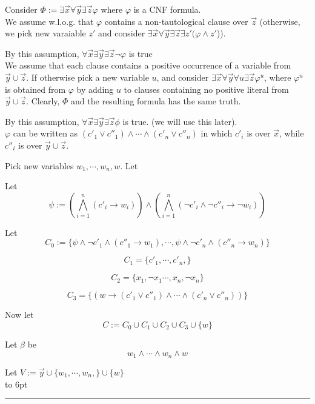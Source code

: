 \documentclass[12pt]{article}
\newenvironment{proof}{\parindent=0pt{\bf Proof: }}{
   \hspace*{\fill}\hbox to 6pt{\leaders\hrule width 6pt height 6pt\hfill}\par}
\begin{document}
\begin{proof}
Consider $\Phi:=\exists \vec{x}\forall\vec{y}\exists \vec{z} \varphi$ where $\varphi$ is a CNF formula. \\

We assume w.l.o.g. that $\varphi$ contains a non-tautological clause over $\vec{z}$ (otherwise, we pick new varaiable $z'$ and consider $\exists\vec{x}\forall\vec{y}\exists\vec{z}\exists z'(\varphi\wedge z'$)).

By this assumption, $\forall\vec{x}\exists\vec{y}\exists\vec{z}\neg \varphi$ is true\\

We assume that each clause contains a positive occurrence of a variable from $\vec{y}\cup\vec{z}$. If otherwise pick a new variable $u$, and consider $\exists \vec{x}\forall\vec{y}\forall u\exists \vec{z}\varphi^u$, where $\varphi^u$ is obtained from $\varphi$ by adding $u$ to clauses containing no positive literal from $\vec{y}\cup\vec{z}$. Clearly, $\Phi$ and the resulting formula has the same truth.

By this assumption, $\forall\vec{x}\exists\vec{y}\exists\vec{z}\phi$ is true. (we will use this later).\\

$\varphi$ can be written as $(c'_1\vee c''_1)\wedge\cdots\wedge (c'_n\vee c''_n)$ in which $c'_i$ is over $\vec{x}$, while $c''_i$ is over $\vec{y}\cup\vec{z}$.

Pick new variables $w_1, \cdots, w_n,w$. Let

Let $$\psi:= \left(\bigwedge_{i=1}^n (c'_i\rightarrow w_i)\right)\wedge
\left(\bigwedge_{i=1}^n(\neg c'_i\wedge \neg c''_i\rightarrow \neg w_i)\right)$$

Let $$C_0:=\{\psi\wedge \neg c'_1\wedge  (c''_1\rightarrow w_1) , \cdots, \psi\wedge\neg c'_n\wedge (c''_n\rightarrow w_n)\}$$

$$C_1=\{c'_1, \cdots, c'_n, \}$$

$$C_2=\{x_1,\neg x_1\cdots, x_n,\neg x_n\}$$

$$C_3=\{(w\rightarrow (c'_1\vee c''_1)\wedge\cdots\wedge (c'_n\vee c''_n))\}$$

Now let $$C:=C_0\cup C_1\cup C_2\cup C_3\cup\{w\}$$

Let $\beta$ be $$ w_1\wedge\cdots\wedge w_n\wedge w$$

Let $V:=\vec{y}\cup\{w_1,\cdots,w_n,\}\cup\{w\}$\\





\end{proof}
\end{document}
